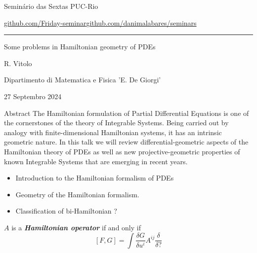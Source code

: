 


\begin{minipage}{\textwidth}
	\begin{minipage}{1\textwidth}
		Semin\'ario das Sextas \hfill PUC-Rio
		
		{\small\href{https://github.com/Friday-seminar/}{github.com/Friday-seminar}\hfill\href{https://github.com/danimalabares/seminars}{github.com/danimalabares/seminars}}
		\end{minipage}
\end{minipage}\vspace{.2cm}\hrule

\vspace{10pt}

{\Huge Some problems in Hamiltonian geometry of PDEs}

\hfill{\Large R. Vitolo}

\hfill{\Large Dipartimento di Matematica e Fisica 'E. De Giorgi'}

\hfill{\large 27 Septembro 2024}

\begin{idea7}{Abstract}\leavevmode
The Hamiltonian formulation of Partial Differential Equations is one of the cornerstones of the theory of Integrable Systems. Being carried out by analogy with finite-dimensional Hamiltonian systems, it has an intrinsic geometric nature. In this talk we will review differential-geometric aspects of the Hamiltonian theory of PDEs as well as new projective-geometric properties of known Integrable Systems that are emerging in recent years.	
\end{idea7}

\tableofcontents

\begin{itemize}
\item Introduction to the Hamiltonian formalism of PDEs
\item Geometry of the Hamiltonian formalism.
\item Classification of bi-Hamiltonian ?
\end{itemize}


\begin{defn}
	$A$ is a \textit{\textbf{Hamiltonian operator}} if and only if
	\[ [F,G]=\int \frac{\delta G}{ \delta u^i}A^{ij}\frac{\delta}{\delta?}\]
\end{defn}

